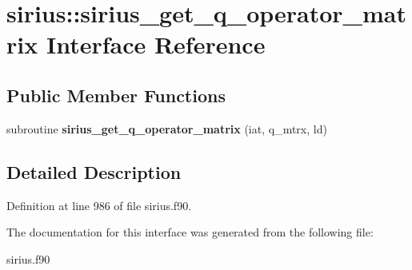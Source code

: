 \hypertarget{interfacesirius_1_1sirius__get__q__operator__matrix}{}\section{sirius\+:\+:sirius\+\_\+get\+\_\+q\+\_\+operator\+\_\+matrix Interface Reference}
\label{interfacesirius_1_1sirius__get__q__operator__matrix}
\subsection*{Public Member Functions}
\begin{DoxyCompactItemize}
\item 
\hypertarget{interfacesirius_1_1sirius__get__q__operator__matrix_a71d76ee2316efacf1633f93e78d32cf8}{}subroutine {\bfseries sirius\+\_\+get\+\_\+q\+\_\+operator\+\_\+matrix} (iat, q\+\_\+mtrx, ld)\label{interfacesirius_1_1sirius__get__q__operator__matrix_a71d76ee2316efacf1633f93e78d32cf8}

\end{DoxyCompactItemize}


\subsection{Detailed Description}


Definition at line 986 of file sirius.\+f90.



The documentation for this interface was generated from the following file\+:\begin{DoxyCompactItemize}
\item 
sirius.\+f90\end{DoxyCompactItemize}
